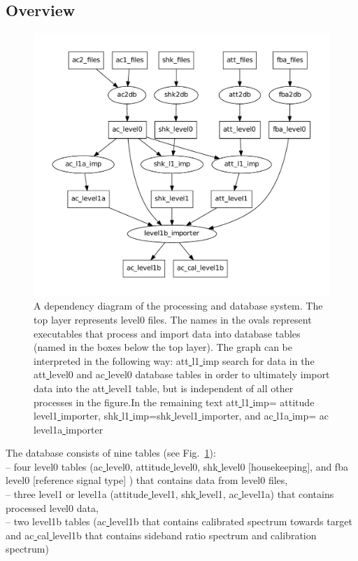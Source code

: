 \documentclass[12pt]{article}
\begin{document}
\subsection{Overview}
\begin{figure}[!t]
\centering
\includegraphics[scale=0.7]{dataflow.pdf}
\caption{A dependency diagram of the processing and database system. 
The top layer represents level0 files.
The names in the ovals represent executables that process and import
data into database tables (named in the boxes below the top layer).
The graph can be interpreted in the following way: 
att\underline{ }l1\underline{ }imp search for data
in the att\underline{ }level0 and ac\underline{ }level0 
database tables in order to ultimately import data into the
att\underline{ }level1 table, but is independent of all
other processes in the figure.In the remaining text
att\underline{ }l1\underline{ }imp= attitude\underline{ }level1\underline{ }importer, shk\underline{ }l1\underline{ }imp=shk\underline{ }level1\underline{ }importer, and ac\underline{ }l1a\underline{ }imp= ac\underline{ }level1a\underline{ }importer
}
\label{fig:database}
\end{figure}


The database consists of nine tables (see Fig.~\ref{fig:database}):\\ 
-- four level0 tables (ac\underline{ }level0, attitude\underline{ }level0, 
shk\underline{ }level0 [housekeeping], and fba\underline{ }level0 
[reference signal type]
) that contains data from level0 files,\\
-- three level1 or level1a (attitude\underline{ }level1, shk\underline{ }level1,
ac\underline{ }level1a) that contains processed level0 data,\\ 
-- two level1b tables (ac\underline{ }level1b that contains calibrated 
spectrum towards target and
ac\underline{ }cal\underline{ }level1b that contains   
sideband ratio spectrum and calibration spectrum)
\end{document}
